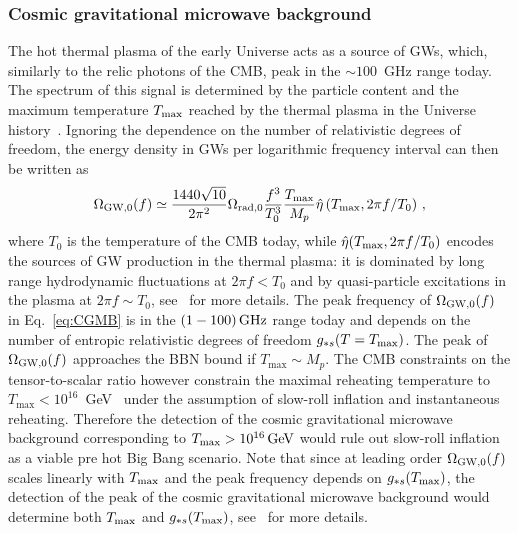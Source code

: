 \documentclass[11pt,a4paper]{article}
\begin{document}

\subsubsection{Cosmic gravitational microwave background}
\label{sec:CGMB}

The hot thermal plasma of the early Universe acts as a source of GWs, which, similarly to the relic photons of the CMB, peak in the $\sim 100$~GHz range today. The spectrum of this signal is determined by the particle content and the maximum temperature $T_{\rm max}$ reached by the thermal plasma in the Universe history~\cite{Ghiglieri:2015nfa, Ghiglieri:2020mhm, Ringwald:2020ist}. Ignoring the dependence on the number of relativistic degrees of freedom, the energy density in GWs per logarithmic frequency interval can then be written as
 \begin{align}
\Omega_{\rm GW,0}(f) \simeq \frac{1440 	\sqrt{10}}{2 \pi^2} \Omega_{{\rm rad}, 0} \frac{f^3}{T_0^3} \frac{T_{\rm max}}{M_p} \hat{\eta} \left(T_{\rm max}, 2 \pi f/T_0\right)\,,
  \label{eq:CGMB}
 \end{align}
where $T_0$ is the temperature of the CMB today, while $\hat{\eta}(T_{\rm max}, 2 \pi f/T_0)$ encodes the sources of GW production in the thermal plasma: it is dominated by long range hydrodynamic fluctuations at $2 \pi f<T_0$ and by quasi-particle excitations in the plasma at $2 \pi f \sim T_0$, see~\cite{Ghiglieri:2015nfa, Ghiglieri:2020mhm, Ringwald:2020ist} for more details. The peak frequency of $\Omega_{\rm GW, 0}(f)$ in Eq.~\eqref{eq:CGMB} is in the $(1-100) \, \rm GHz$ range today and depends on the number of entropic relativistic degrees of freedom $g_{*s}(T = T_{\rm max})$.
The peak of $\Omega_{\rm GW, 0}(f)$ approaches the BBN bound if $T_\text{max} \sim M_p$. The CMB constraints on the tensor-to-scalar ratio however constrain the maximal reheating temperature to $T_\text{max} < 10^{16}$~GeV~\cite{Akrami:2018odb} under the assumption of slow-roll inflation and instantaneous reheating. Therefore the detection of the cosmic gravitational microwave background corresponding to $T_{\rm max} > 10^{16} \, \rm{GeV}$ would rule out slow-roll inflation as a viable pre hot Big Bang scenario. Note that since at leading order $\Omega_{\rm GW,0}(f)$ scales linearly with $T_{\rm max}$ and the peak frequency depends on $g_{*s}(T_{\rm max})$, the detection of the peak of the cosmic gravitational microwave background would determine both $T_{\rm max}$ and $g_{*s}(T_{\rm max})$, see~\cite{Ringwald:2020ist} for more details.
\end{document}

